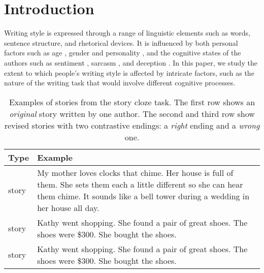 \documentclass[11pt,a4paper]{article}
\begin{document}
\section{Introduction}
Writing style is 
expressed through a range of linguistic elements such as words, sentence structure, and rhetorical devices.
It is influenced by both 
personal 
factors such as age \cite{Schler:2006}, gender \cite{Argamon:2003} 
and 
personality \cite{Stamatatos:2009}, 
and the cognitive states of the authors such as 
sentiment \cite{Davidov:2010}, sarcasm \cite{Tsur:2010}, and deception \cite{Feng:2012}.  
In this paper, we study 
the extent to which people's 
writing style is affected by intricate factors, such as 
the nature of the writing task that would involve different cognitive processes. 

\begin{table}[!t]
\begin{tabular}{|p{1.6cm}|p{5.3cm}|} \hline
{\bf Type} & {\bf Example} \\ \hline
{\color{blue}{\it Original}} story & My mother loves clocks that chime.	Her house is full of them.	She sets them each a little different so she can hear them chime.	It sounds like a bell tower during a wedding in her house all day.	{\color{blue}{When I visit I stop them or I'd never be able to sleep at night.}} \\ \hline
{\color{forestgreen}{\it Coherent}} story & Kathy went shopping.	She found a pair of great shoes.	The shoes were \$300.	She bought the shoes.	{\color{forestgreen}{She felt buyer's remorse after the purchase.}} \\ \hline
{\color{red}{\it Incoherent}} story & Kathy went shopping.	She found a pair of great shoes.	The shoes were \$300.	She bought the shoes.	{\color{red}{Kathy hated buying shoes.}} \\ \hline
\end{tabular}
\caption{\label{ROC-example}
Examples of stories from the story cloze task. The first row shows an {\it original} story written by one author. 
The second and third row show revised stories with two contrastive endings:
 a {\it right} ending and a {\it wrong} one.
}
\end{table}
\end{document}
